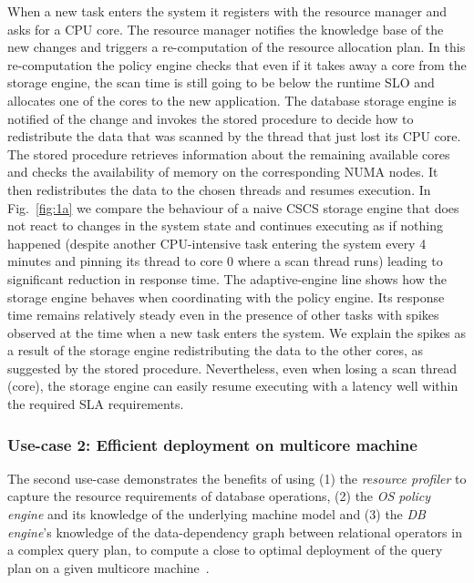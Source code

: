 \documentclass[11pt]{article}
\begin{document}
When a new task enters the system it registers with the resource manager and asks for a CPU core.
The resource manager notifies the knowledge base of the new changes and triggers
a re-computation of the resource allocation plan. In this re-computation the policy engine
checks that even if it takes away a core from the storage engine, the scan time is still 
going to be below the 
runtime SLO and allocates one of the cores to the new application. The database storage engine 
is notified of the change and invokes the stored procedure to decide how to redistribute the
data that was scanned by the thread that just lost its CPU core. The stored procedure retrieves
information about the remaining available cores and checks the availability of memory on the 
corresponding NUMA nodes. It then redistributes the data to the chosen threads and resumes execution.
In Fig.~\ref{fig:1a} we compare the behaviour of a naive CSCS storage engine that does not 
react to changes in the system state and continues executing as if nothing happened (despite 
another CPU-intensive task entering the system every 4 minutes and pinning its thread
to core 0 where a scan thread runs) leading to significant reduction in response time. The 
adaptive-engine line shows how the storage engine behaves when coordinating with the 
policy engine. Its response time remains relatively steady even in the presence of 
other tasks with spikes observed at the time when a new task enters the system. 
We explain the spikes as a result of the storage engine redistributing the data to the 
other cores, as suggested by the stored procedure. Nevertheless, even when losing a scan 
thread (core), the storage engine can easily resume executing with a latency well within the 
required SLA requirements.

\subsubsection*{Use-case 2: Efficient deployment on multicore machine}

The second use-case demonstrates the benefits of using (1) the {\it resource profiler} to 
capture the resource requirements of database operations, (2) the {\it OS policy engine}
and its
knowledge of the underlying machine model and (3) the {\it DB engine}'s knowledge of the 
data-dependency graph between relational operators in a complex query plan, to compute 
a close to optimal deployment of the query plan on a given multicore 
machine~\cite{Giceva:vldb14}.
\end{document}
